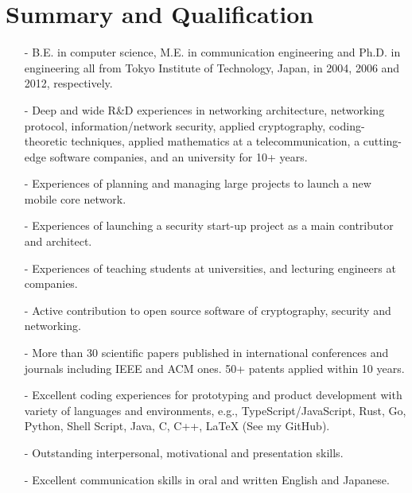 \section*{Summary and Qualification}
\begin{itemize}
 \item[-] B.E. in computer science, M.E. in communication engineering and Ph.D. in engineering all from Tokyo Institute of Technology, Japan, in 2004, 2006 and 2012, respectively.
 \item[-] Deep and wide R\&D experiences in networking architecture, networking protocol, information/network security, applied cryptography, coding-theoretic techniques, applied mathematics at a telecommunication, a cutting-edge software companies, and an university for 10+ years.
 \item[-] Experiences of planning and managing large projects to launch a new mobile core network.
 \item[-] Experiences of launching a security start-up project as a main contributor and architect.
 \item[-] Experiences of teaching students at universities, and lecturing engineers at companies.
 \item[-] Active contribution to open source software of cryptography, security and networking.
 \item[-] More than 30 scientific papers published in international conferences and journals including IEEE and ACM ones. 50+ patents applied within 10 years.
 \item[-] Excellent coding experiences for prototyping and product development with variety of languages and environments, e.g., TypeScript/JavaScript, Rust, Go, Python, Shell Script, Java, C, C++, LaTeX (See my GitHub).
 \item[-] Outstanding interpersonal, motivational and presentation skills.
 \item[-] Excellent communication skills in oral and written English and Japanese.
\end{itemize}
